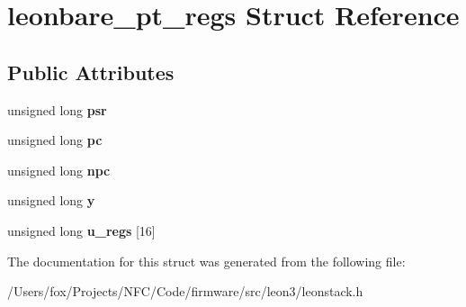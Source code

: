 \hypertarget{structleonbare__pt__regs}{
\section{leonbare\_\-pt\_\-regs Struct Reference}
\label{structleonbare__pt__regs}
}
\subsection*{Public Attributes}
\begin{DoxyCompactItemize}
\item 
\hypertarget{structleonbare__pt__regs_ac4a6551252d41d539e5294408fa37d7f}{
unsigned long {\bfseries psr}}
\label{structleonbare__pt__regs_ac4a6551252d41d539e5294408fa37d7f}

\item 
\hypertarget{structleonbare__pt__regs_a6028d121e2b7a454dc6f1b564e3e4384}{
unsigned long {\bfseries pc}}
\label{structleonbare__pt__regs_a6028d121e2b7a454dc6f1b564e3e4384}

\item 
\hypertarget{structleonbare__pt__regs_a549cbfb01f2148204975fd803176104a}{
unsigned long {\bfseries npc}}
\label{structleonbare__pt__regs_a549cbfb01f2148204975fd803176104a}

\item 
\hypertarget{structleonbare__pt__regs_a6b83ba76380c6c1d46f8a8b2f2a4d60e}{
unsigned long {\bfseries y}}
\label{structleonbare__pt__regs_a6b83ba76380c6c1d46f8a8b2f2a4d60e}

\item 
\hypertarget{structleonbare__pt__regs_abce47dd052a4233b9acf155c79d39d62}{
unsigned long {\bfseries u\_\-regs} \mbox{[}16\mbox{]}}
\label{structleonbare__pt__regs_abce47dd052a4233b9acf155c79d39d62}

\end{DoxyCompactItemize}


The documentation for this struct was generated from the following file:\begin{DoxyCompactItemize}
\item 
/Users/fox/Projects/NFC/Code/firmware/src/leon3/leonstack.h\end{DoxyCompactItemize}
